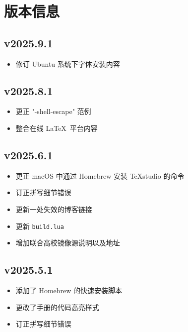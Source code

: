 
\twocolumn

\chapter{版本信息}

\section*{v2025.9.1}

\begin{itemize}
  \item 修订 Ubuntu 系统下字体安装内容
\end{itemize}

\section*{v2025.8.1}

\begin{itemize}
  \item 更正 "-shell-escape" 范例
  \item 整合在线 \LaTeX\ 平台内容
\end{itemize}

\section*{v2025.6.1}

\begin{itemize}
  \item 更正 macOS 中通过 Homebrew 安装 \TeX studio 的命令
  \item 订正拼写细节错误
  \item 更新一处失效的博客链接
  \item 更新 \texttt{build.lua}
  \item 增加联合高校镜像源说明以及地址
\end{itemize}

\section*{v2025.5.1}

\begin{itemize}
  \item 添加了 Homebrew 的快速安装脚本
  \item 更改了手册的代码高亮样式
  \item 订正拼写细节错误
\end{itemize}

